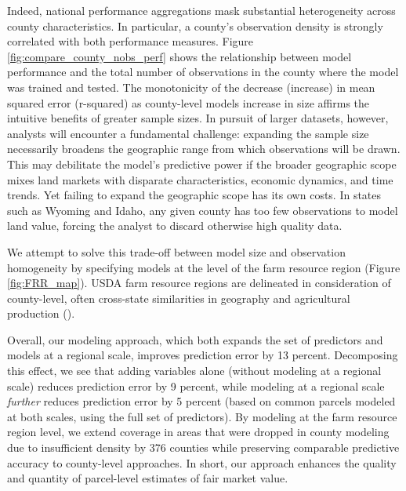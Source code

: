 \documentclass[12pt]{article}
\begin{document}
Indeed, national performance aggregations mask substantial heterogeneity across county characteristics. In particular, a county's observation density is strongly correlated with both performance measures. Figure \ref{fig:compare_county_nobs_perf} shows the relationship between model performance and the total number of observations in the county where the model was trained and tested. The monotonicity of the decrease (increase) in mean squared error (r-squared) as county-level models increase in size affirms the intuitive benefits of greater sample sizes. In pursuit of larger datasets, however, analysts will encounter a fundamental challenge: expanding the sample size necessarily broadens the geographic range from which observations will be drawn. This may debilitate the model's predictive power if the broader geographic scope mixes land markets with disparate characteristics, economic dynamics, and time trends. Yet failing to expand the geographic scope has its own costs. In states such as Wyoming and Idaho, any given county has too few observations to model land value, forcing the analyst to discard otherwise high quality data.

We attempt to solve this trade-off between model size and observation homogeneity by specifying models at the level of the farm resource region (Figure \ref{fig:FRR_map}). USDA farm resource regions are delineated in consideration of county-level, often cross-state similarities in geography and agricultural production (\cite{FRR2000}).

Overall, our modeling approach, which both expands the set of predictors and models at a regional scale, improves prediction error by 13 percent. Decomposing this effect, we see that adding variables alone (without modeling at a regional scale) reduces prediction error by 9 percent, while modeling at a regional scale \textit{further} reduces prediction error by 5 percent (based on common parcels modeled at both scales, using the full set of predictors). By modeling at the farm resource region level, we extend coverage in areas that were dropped in county modeling due to insufficient density by 376 counties while preserving comparable predictive accuracy to county-level approaches. In short, our approach enhances the quality and quantity of parcel-level estimates of fair market value. 
\end{document}
